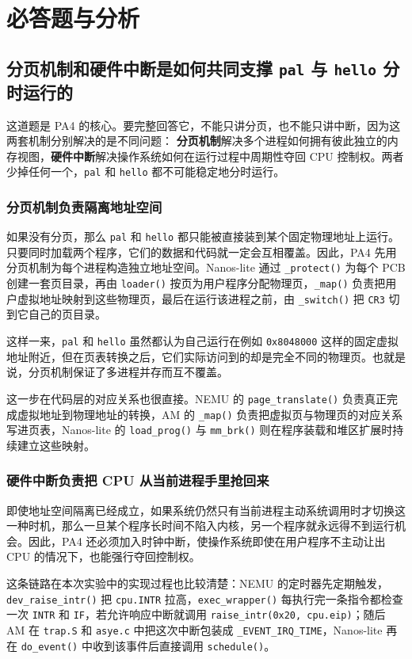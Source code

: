 \documentclass[a4paper]{article}
\begin{document}
\section{必答题与分析}

\subsection{分页机制和硬件中断是如何共同支撑 \texttt{pal} 与 \texttt{hello} 分时运行的}
这道题是 PA4 的核心。要完整回答它，不能只讲分页，也不能只讲中断，因为这两套机制分别解决的是不同问题：
\textbf{分页机制}解决多个进程如何拥有彼此独立的内存视图，\textbf{硬件中断}解决操作系统如何在运行过程中周期性夺回 CPU 控制权。两者少掉任何一个，\texttt{pal} 和 \texttt{hello} 都不可能稳定地分时运行。

\subsubsection{分页机制负责隔离地址空间}
如果没有分页，那么 \texttt{pal} 和 \texttt{hello} 都只能被直接装到某个固定物理地址上运行。只要同时加载两个程序，它们的数据和代码就一定会互相覆盖。因此，PA4 先用分页机制为每个进程构造独立地址空间。Nanos-lite 通过 \texttt{\_protect()} 为每个 PCB 创建一套页目录，再由 \texttt{loader()} 按页为用户程序分配物理页，\texttt{\_map()} 负责把用户虚拟地址映射到这些物理页，最后在运行该进程之前，由 \texttt{\_switch()} 把 \texttt{CR3} 切到它自己的页目录。

这样一来，\texttt{pal} 和 \texttt{hello} 虽然都认为自己运行在例如 \texttt{0x8048000} 这样的固定虚拟地址附近，但在页表转换之后，它们实际访问到的却是完全不同的物理页。也就是说，分页机制保证了多进程并存而互不覆盖。

这一步在代码层的对应关系也很直接。NEMU 的 \texttt{page\_translate()} 负责真正完成虚拟地址到物理地址的转换，AM 的 \texttt{\_map()} 负责把虚拟页与物理页的对应关系写进页表，Nanos-lite 的 \texttt{load\_prog()} 与 \texttt{mm\_brk()} 则在程序装载和堆区扩展时持续建立这些映射。

\subsubsection{硬件中断负责把 CPU 从当前进程手里抢回来}
即使地址空间隔离已经成立，如果系统仍然只有当前进程主动系统调用时才切换这一种时机，那么一旦某个程序长时间不陷入内核，另一个程序就永远得不到运行机会。因此，PA4 还必须加入时钟中断，使操作系统即使在用户程序不主动让出 CPU 的情况下，也能强行夺回控制权。

这条链路在本次实验中的实现过程也比较清楚：NEMU 的定时器先定期触发，\texttt{dev\_raise\_intr()} 把 \texttt{cpu.INTR} 拉高，\texttt{exec\_wrapper()} 每执行完一条指令都检查一次 \texttt{INTR} 和 \texttt{IF}，若允许响应中断就调用 \texttt{raise\_intr(0x20, cpu.eip)}；随后 AM 在 \texttt{trap.S} 和 \texttt{asye.c} 中把这次中断包装成 \texttt{\_EVENT\_IRQ\_TIME}，Nanos-lite 再在 \texttt{do\_event()} 中收到该事件后直接调用 \texttt{schedule()}。
\end{document}
